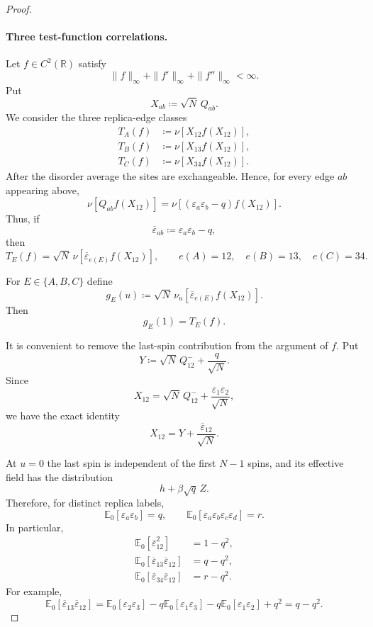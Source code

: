 \begin{proof}
\paragraph{Three test-function correlations.}
Let $f\in C^2(\mathbb R)$ satisfy
\[
 \|f\|_\infty+\|f'\|_\infty+\|f''\|_\infty<\infty.
\]
Put
\[
 X_{ab}\coloneqq\sqrt N\,Q_{ab}.
\]
We consider the three replica-edge classes
\begin{align}
 T_A(f)&\coloneqq\nu[X_{12}f(X_{12})],
 \label{eq:clt-TA}\\
 T_B(f)&\coloneqq\nu[X_{13}f(X_{12})],
 \label{eq:clt-TB}\\
 T_C(f)&\coloneqq\nu[X_{34}f(X_{12})].
 \label{eq:clt-TC}
\end{align}
After the disorder average the sites are exchangeable.  Hence, for every
edge $ab$ appearing above,
\[
 \nu[Q_{ab}f(X_{12})]
 =
 \nu[(\varepsilon_a\varepsilon_b-q)f(X_{12})].
\]
Thus, if
\[
 \overline\varepsilon_{ab}
 \coloneqq
 \varepsilon_a\varepsilon_b-q,
\]
then
\begin{equation}
 T_E(f)
 =
 \sqrt N\,\nu[
 \overline\varepsilon_{e(E)}f(X_{12})],
 \qquad
 e(A)=12,\quad e(B)=13,\quad e(C)=34.
 \label{eq:clt-site-exchangeability}
\end{equation}

For $E\in\{A,B,C\}$ define
\[
 g_E(u)
 \coloneqq
 \sqrt N\,\nu_u[
 \overline\varepsilon_{e(E)}f(X_{12})].
\]
Then
\[
 g_E(1)=T_E(f).
\]

It is convenient to remove the last-spin contribution from the argument of
$f$.  Put
\begin{equation}
 Y
 \coloneqq
 \sqrt N\,Q^-_{12}+\frac q{\sqrt N}.
 \label{eq:clt-Yminus}
\end{equation}
Since
\[
 X_{12}
 =
 \sqrt N\,Q^-_{12}+\frac{\varepsilon_1\varepsilon_2}{\sqrt N},
\]
we have the exact identity
\begin{equation}
 X_{12}
 =
 Y+\frac{\overline\varepsilon_{12}}{\sqrt N}.
 \label{eq:clt-X-Y}
\end{equation}

At $u=0$ the last spin is independent of the first $N-1$ spins, and its
effective field has the distribution
\[
 h+\beta\sqrt q\,Z.
\]
Therefore, for distinct replica labels,
\[
 \mathbb E_0[\varepsilon_a\varepsilon_b]=q,
 \qquad
 \mathbb E_0[
 \varepsilon_a\varepsilon_b\varepsilon_c\varepsilon_d]=r.
\]
In particular,
\begin{align}
 \mathbb E_0[\overline\varepsilon_{12}^2]
 &=1-q^2,
 \label{eq:clt-source-A}\\
 \mathbb E_0[
 \overline\varepsilon_{13}\overline\varepsilon_{12}]
 &=q-q^2,
 \label{eq:clt-source-B}\\
 \mathbb E_0[
 \overline\varepsilon_{34}\overline\varepsilon_{12}]
 &=r-q^2.
 \label{eq:clt-source-C}
\end{align}
For example,
\[
 \mathbb E_0[
 \overline\varepsilon_{13}\overline\varepsilon_{12}]
 =
 \mathbb E_0[\varepsilon_2\varepsilon_3]
 -q\mathbb E_0[\varepsilon_1\varepsilon_3]
 -q\mathbb E_0[\varepsilon_1\varepsilon_2]
 +q^2
 =
 q-q^2.
\]


\end{proof}

